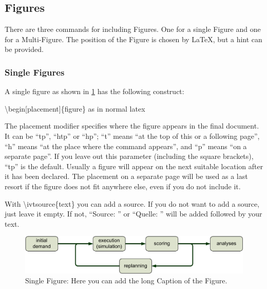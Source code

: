 \documentclass[numbered]{ivt-style/standard}\usepackage[]{graphicx}\usepackage[]{xcolor}
\providecommand{\ivthline}{}
\begin{document}
\subsection{Figures} \label{sec:compStructs-Figures}

There are three commands for including Figures. One for a single Figure
and one for a Multi-Figure. The position of the Figure is chosen by
\LaTeX,
but a hint can be provided.

\subsubsection{Single Figures}

\label{sec:compStructs-Figures-SingleFigures}

A single figure as shown in \cref{fig:labelOfTheSingleFigure}
has the following construct:

\textbackslash{}begin[placement]\{figure\} as in normal latex

The placement modifier
specifies where the figure appears in the final document.
It can be ``tp'', ``htp'' or ``hp'';
``t'' means ``at the top of this or a following page'',
``h'' means ``at the place where the command appears'',
and ``p'' means ``on a separate page''.
If you leave out this parameter (including the square brackets),
``tp'' is the default.
Usually a figure will appear on the next suitable location
after it has been declared.
The placement on a separate page will be used as a last resort
if the figure does not fit anywhere else, even if you do not include it.

With \textbackslash{}ivtsource\{text\} you can add a source. If you do not want
to add a source, just leave it empty. If not, ``Source: '' or
``Quelle: '' will be added followed by your text.


\begin{figure}%
\caption{Single Figure: Here you can add the long Caption of the Figure.}%
\label{fig:labelOfTheSingleFigure}%
\includegraphics[width=1.0\textwidth]{figures/MATSimLoop}%
\ivthline
\end{figure}
\end{document}
